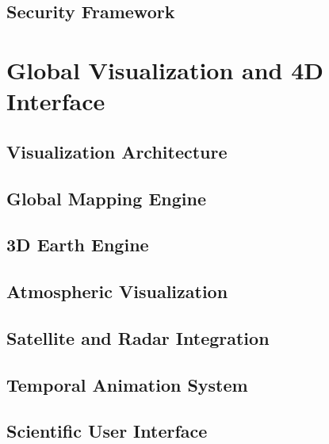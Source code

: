 \documentclass[11pt,a4paper,oneside]{report}
\begin{document}
\chapter{Security Framework}




\part{Global Visualization and 4D Interface}


\chapter{Visualization Architecture}



\chapter{Global Mapping Engine}



\chapter{3D Earth Engine}



\chapter{Atmospheric Visualization}



\chapter{Satellite and Radar Integration}



\chapter{Temporal Animation System}



\chapter{Scientific User Interface}

\end{document}
